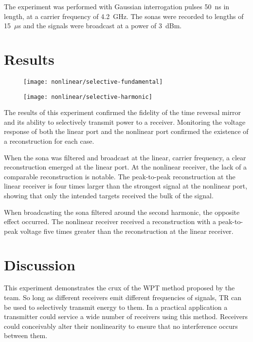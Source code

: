 The experiment was performed with Gaussian interrogation pulses 50~ns in length, at a carrier frequency of 4.2~GHz. The sonas were recorded to lengths of 15~$\mu$s and the signals were broadcast at a power of 3~dBm.

\section{Results}
\label{sec:selective-results}

\begin{figure}[h]
\centering
\texttt{[image: nonlinear/selective-fundamental]}
    \caption[]{}
    \label{fig:selective-fundamental}
\end{figure}
\begin{figure}[h]
\centering
\texttt{[image: nonlinear/selective-harmonic]}
    \caption[]{}
    \label{fig:selective-harmonic}
\end{figure}

The results of this experiment confirmed the fidelity of the time reversal mirror and its ability to selectively transmit power to a receiver. Monitoring the voltage response of both the linear port and the nonlinear port confirmed the existence of a reconstruction for each case.

When the sona was filtered and broadcast at the linear, carrier frequency, a clear reconstruction emerged at the linear port. At the nonlinear receiver, the lack of a comparable reconstruction is notable. The peak-to-peak reconstruction at the linear receiver is four times larger than the strongest signal at the nonlinear port, showing that only the intended targets received the bulk of the signal.

When broadcasting the sona filtered around the second harmonic, the opposite effect occurred. The nonlinear receiver received a reconstruction with a peak-to-peak voltage five times greater than the reconstruction at the linear receiver.

\section{Discussion}
\label{sec:selective-discussion}

This experiment demonstrates the crux of the WPT method proposed by the team. So long as different receivers emit different frequencies of signals, TR can be used to selectively transmit energy to them. In a practical application a transmitter could service a wide number of receivers using this method. Receivers could conceivably alter their nonlinearity to ensure that no interference occurs between them.

